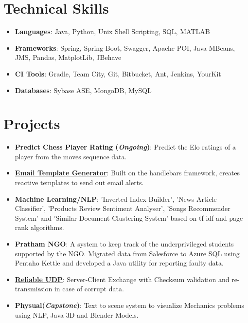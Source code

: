 \documentclass[letterpaper,11pt]{article}
\newcommand{\resumeItem}[2]{
  \item\small{
    \textbf{#1}{: #2 \vspace{-2pt}}
  }
}
\newcommand{\resumeSubItem}[2]{\resumeItem{#1}{#2}\vspace{-4pt}}
\newcommand{\resumeSubHeadingListStart}{\begin{itemize}[leftmargin=*]}
\newcommand{\resumeSubHeadingListEnd}{\end{itemize}}
\begin{document}
\section{Technical Skills}
 \resumeSubHeadingListStart
 \resumeSubItem{Languages}{Java, Python, Unix Shell Scripting, SQL, MATLAB}
 \resumeSubItem{Frameworks}{Spring, Spring-Boot, Swagger, Apache POI, Java MBeans, JMS, Pandas, MatplotLib, JBehave}
 \resumeSubItem{CI Tools}{Gradle, Team City, Git, Bitbucket, Ant, Jenkins, YourKit}
 \resumeSubItem{Databases}{Sybase ASE, MongoDB, MySQL}
 \resumeSubHeadingListEnd

\section{Projects}
  \resumeSubHeadingListStart
  \resumeSubItem{Predict Chess Player Rating (\textit{Ongoing})} {
    Predict the Elo ratings of a player from the moves sequence data.
  }
  \resumeSubItem{\href{https://github.com/amanpreet692/HandleBarsEmailTemplate}
    {Email Template Generator}}
    {Built on the handlebars framework, creates reactive templates to send out email alerts.}
    \resumeSubItem{Machine Learning/NLP}
    {'Inverted Index Builder', 'News Article Classifier', 'Products Review Sentiment Analyser', 'Songs Recommender System' and 'Similar Document Clustering System' based on tf-idf and page rank algorithms.
    }\resumeSubItem{Pratham NGO}
      {A system to keep track of the  underprivileged students supported by the NGO. Migrated data from Salesforce to Azure SQL using Pentaho Kettle and developed a Java utility for reporting faulty data.}
    \resumeSubItem{\href{https://bitbucket.org/APS692/udp-with-error-detection} {Reliable UDP}}
      {Server-Client Exchange with Checksum validation and re-transmission in case of corrupt data.}
  \resumeSubItem{Physual(\textit{Capstone})}
      {Text to scene system to visualize Mechanics problems using NLP, Java 3D and Blender Models.}
  \resumeSubHeadingListEnd
\end{document}

